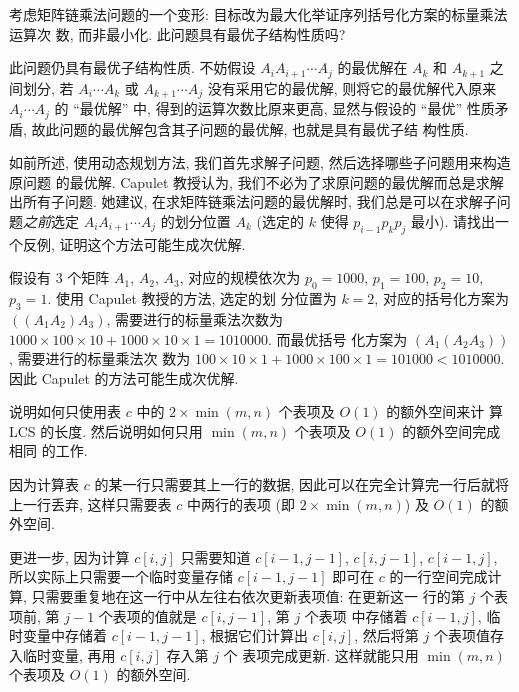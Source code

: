 \documentclass[boxes]{homework}
\begin{document}
\begin{problem}
考虑矩阵链乘法问题的一个变形: 目标改为最大化举证序列括号化方案的标量乘法运算次
数, 而非最小化. 此问题具有最优子结构性质吗?
\end{problem}
\begin{solution}
    此问题仍具有最优子结构性质. 不妨假设 $A_{i}A_{i+1}\cdots A_{j}$ 的最优解在
    $A_{k}$ 和 $A_{k+1}$ 之间划分, 若 $A_{i}\cdots A_{k}$ 或
    $A_{k+1}\cdots A_{j}$ 没有采用它的最优解, 则将它的最优解代入原来
    $A_{i}\cdots A_{j}$ 的 ``最优解'' 中, 得到的运算次数比原来更高, 显然与假设的
    ``最优'' 性质矛盾, 故此问题的最优解包含其子问题的最优解, 也就是具有最优子结
    构性质.
\end{solution}

\begin{problem}
如前所述, 使用动态规划方法, 我们首先求解子问题, 然后选择哪些子问题用来构造原问题
的最优解. Capulet 教授认为, 我们不必为了求原问题的最优解而总是求解出所有子问题.
她建议, 在求矩阵链乘法问题的最优解时, 我们总是可以在求解子问题\textit{之前}选定
$A_{i}A_{i+1}\cdots A_{j}$ 的划分位置 $A_{k}$ (选定的 $k$ 使得
$p_{i-1}p_{k}p_{j}$ 最小). 请找出一个反例, 证明这个方法可能生成次优解.
\end{problem}
\begin{solution}
    假设有 3 个矩阵 $A_{1}$, $A_{2}$, $A_{3}$, 对应的规模依次为 $p_{0} = 1000$,
    $p_{1} = 100$, $p_{2} = 10$, $p_{3} = 1$. 使用 Capulet 教授的方法, 选定的划
    分位置为 $k = 2$, 对应的括号化方案为
    $\left( \left( A_{1}A_{2}\right)A_{3}\right)$, 需要进行的标量乘法次数为
    $1000 \times 100 \times 10 + 1000 \times 10 \times 1 = 1010000$. 而最优括号
    化方案为 $\left( A_{1}\left( A_{2}A_{3}\right)\right)$, 需要进行的标量乘法次
    数为 $100 \times 10 \times 1 + 1000 \times 100 \times 1 = 101000 < 1010000$.
    因此 Capulet 的方法可能生成次优解.
\end{solution}


\begin{problem}
说明如何只使用表 $c$ 中的 $2 \times \min (m, n)$ 个表项及 $O(1)$ 的额外空间来计
算 LCS 的长度. 然后说明如何只用 $\min(m, n)$ 个表项及 $O(1)$ 的额外空间完成相同
的工作.
\end{problem}
\begin{solution}
    因为计算表 $c$ 的某一行只需要其上一行的数据, 因此可以在完全计算完一行后就将
    上一行丢弃, 这样只需要表 $c$ 中两行的表项 (即 $2 \times \min(m,n)$) 及
    $O(1)$ 的额外空间.

    更进一步, 因为计算 $c[i, j]$ 只需要知道 $c[i - 1, j - 1]$, $c[i, j - 1]$,
    $c[i - 1, j]$, 所以实际上只需要一个临时变量存储 $c[i - 1, j - 1]$ 即可在 $c$
    的一行空间完成计算, 只需要重复地在这一行中从左往右依次更新表项值: 在更新这一
    行的第 $j$ 个表项前, 第 $j - 1$ 个表项的值就是 $c[i, j - 1]$, 第 $j$ 个表项
    中存储着 $c[i - 1, j]$, 临时变量中存储着 $c[i - 1, j - 1]$, 根据它们计算出
    $c[i, j]$, 然后将第 $j$ 个表项值存入临时变量, 再用 $c[i, j]$ 存入第 $j$ 个
    表项完成更新. 这样就能只用 $\min(m, n)$ 个表项及 $O(1)$ 的额外空间.
\end{solution}
\end{document}

